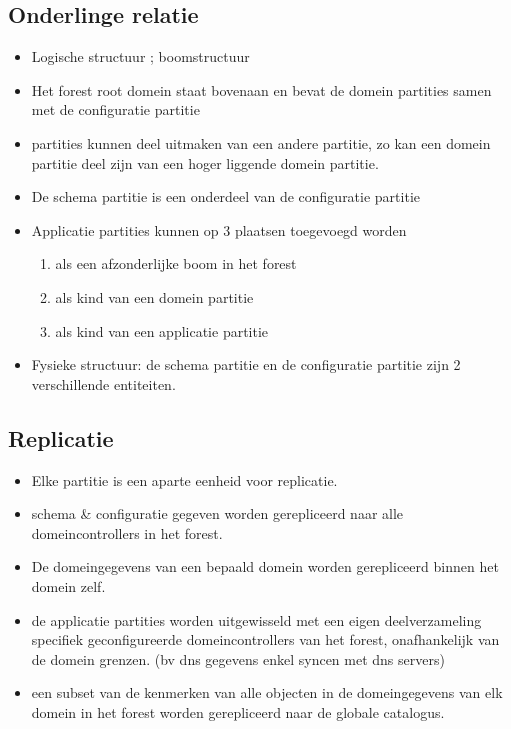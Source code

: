 \subsection{Onderlinge relatie}
\begin{itemize}
\item Logische structuur ; boomstructuur
\item Het forest root domein staat bovenaan en bevat de domein partities samen met de configuratie partitie
\item partities kunnen deel uitmaken van een andere partitie, zo kan een domein partitie deel zijn van een hoger liggende domein partitie.
\item De schema partitie is een onderdeel van de configuratie partitie
\item Applicatie partities kunnen op 3 plaatsen toegevoegd worden
\begin{enumerate}
\item als een afzonderlijke boom in het forest
\item als kind van een domein partitie
\item als kind van een applicatie partitie
\end{enumerate}
\item Fysieke structuur: de schema partitie en de configuratie partitie zijn 2 verschillende entiteiten.
\end{itemize}

\subsection{Replicatie}
\begin{itemize}
\item Elke partitie is een aparte eenheid voor replicatie.
\item schema & configuratie gegeven worden gerepliceerd naar alle domeincontrollers in het forest. 
\item De domeingegevens van een bepaald domein worden gerepliceerd binnen het domein zelf.
\item de applicatie partities worden uitgewisseld met een eigen deelverzameling specifiek geconfigureerde domeincontrollers van het forest, onafhankelijk van de domein grenzen. (bv dns gegevens enkel syncen met dns servers)
\item een subset van de kenmerken van alle objecten in de domeingegevens van elk domein in het forest worden gerepliceerd naar de globale catalogus.
\end{itemize}